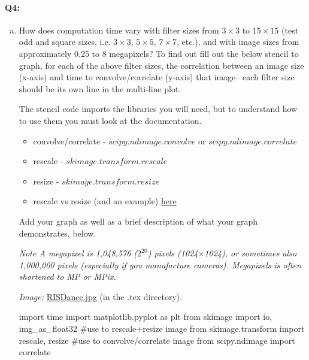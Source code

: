 
\pagebreak
\paragraph{Q4:} 
\begin{enumerate}[(a)]
    \item 
    How does computation time vary with filter sizes from $3\times3$ to $15\times15$ (test odd and square sizes, i.e. $3\times3$, $5\times5$, $7\times7$, etc.), and with image sizes from approximately 0.25 to 8 megapixels? To find out fill out the below stencil to graph, for each of the above filter sizes, the correlation between an image size (x-axis) and time to convolve/correlate (y-axis) that image– each filter size should be its own line in the multi-line plot. 
    
    The stencil code imports the libraries you will need, but to understand how to use them you must look at the documentation.
    \begin{itemize}
    \item convolve/correlate - \href{https://docs.scipy.org/doc/scipy/reference/generated/scipy.ndimage.convolve.html}{$scipy.ndimage.convolve$} or \href{https://docs.scipy.org/doc/scipy/reference/generated/scipy.ndimage.correlate.html}{$scipy.ndimage.correlate$}
    \item rescale - \href{https://scikit-image.org/docs/dev/api/skimage.transform.html#skimage.transform.rescale}{$skimage.transform.rescale$}
    \item resize - \href{https://scikit-image.org/docs/dev/api/skimage.transform.html#skimage.transform.resize}{$skimage.transform.resize$}
    \item rescale vs resize (and an example) \href{http://scikit-image.org/docs/dev/auto_examples/transform/plot_rescale.html}{here}
    \end{itemize} 

    
    Add your graph as well as a brief description of what your graph demonstrates, below.

\emph{Note A megapixel is 1,048,576 ($2^20$) pixels (1024$\times$1024), or sometimes also 1,000,000 pixels (especially if you manufacture cameras). Megapixels is often shortened to MP or MPix.}

\emph{Image:} \href{RISDance.jpg}{RISDance.jpg} (in the .tex directory).

\begin{python}
import time 
import matplotlib.pyplot as plt
from skimage import io, img_as_float32
#use to rescale+resize image
from skimage.transform import rescale, resize
#use to convolve/correlate image
from scipy.ndimage import correlate


\end{python}
\end{enumerate}
